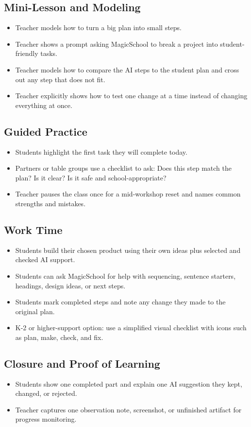 \documentclass[11pt]{article}
\begin{document}
\subsection*{Mini-Lesson and Modeling}
\begin{itemize}
\item Teacher models how to turn a big plan into small steps.
\item Teacher shows a prompt asking MagicSchool to break a project into student-friendly tasks.
\item Teacher models how to compare the AI steps to the student plan and cross out any step that does not fit.
\item Teacher explicitly shows how to test one change at a time instead of changing everything at once.
\end{itemize}

\subsection*{Guided Practice}
\begin{itemize}
\item Students highlight the first task they will complete today.
\item Partners or table groups use a checklist to ask: Does this step match the plan? Is it clear? Is it safe and school-appropriate?
\item Teacher pauses the class once for a mid-workshop reset and names common strengths and mistakes.
\end{itemize}

\subsection*{Work Time}
\begin{itemize}
\item Students build their chosen product using their own ideas plus selected and checked AI support.
\item Students can ask MagicSchool for help with sequencing, sentence starters, headings, design ideas, or next steps.
\item Students mark completed steps and note any change they made to the original plan.
\item K-2 or higher-support option: use a simplified visual checklist with icons such as plan, make, check, and fix.
\end{itemize}

\subsection*{Closure and Proof of Learning}
\begin{itemize}
\item Students show one completed part and explain one AI suggestion they kept, changed, or rejected.
\item Teacher captures one observation note, screenshot, or unfinished artifact for progress monitoring.
\end{itemize}
\end{document}

